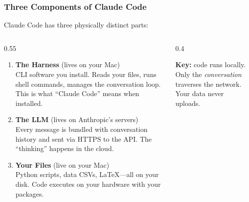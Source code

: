 \documentclass[10pt,english,aspectratio=169]{beamer}
\begin{document}
\begin{frame}
\frametitle{Three Components of Claude Code}

Claude Code has three physically distinct parts:

\vspace{0.2cm}

\begin{columns}[T]
\begin{column}{0.55\textwidth}
\begin{enumerate}
    \item \textbf{The Harness} (lives on your Mac)\\
    \small CLI software you install. Reads your files, runs shell commands, manages the conversation loop. This is what ``Claude Code'' means when installed.

    \vspace{0.2cm}

    \item \textbf{The LLM} (lives on Anthropic's servers)\\
    \small Every message is bundled with conversation history and sent via HTTPS to the API. The ``thinking'' happens in the cloud.

    \vspace{0.2cm}

    \item \textbf{Your Files} (live on your Mac)\\
    \small Python scripts, data CSVs, LaTeX---all on your disk. Code executes on your hardware with your packages.
\end{enumerate}
\end{column}
\begin{column}{0.4\textwidth}
\begin{center}
\end{center}
\vspace{0.3cm}
\footnotesize
\textbf{Key:} code runs locally.\\
Only the \textit{conversation} traverses the network. Your data never uploads.
\end{column}
\end{columns}
\end{frame}
\end{document}

